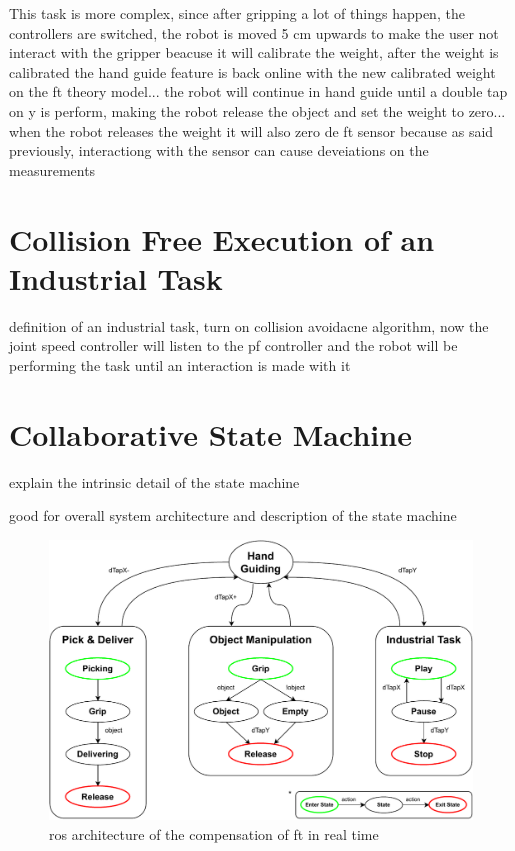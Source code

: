 \par This task is more complex, since after gripping a lot of things happen, the controllers are switched, the robot is moved 5 cm upwards to make the user not interact with the gripper beacuse it will calibrate the weight, after the weight is calibrated the hand guide feature is back online with the new calibrated weight on the ft theory model... the robot will continue in hand guide until a double tap on y is perform, making the robot release the object and set the weight to zero... when the robot releases the weight it will also zero de ft sensor because as said previously, interactiong with the sensor can cause deveiations on the measurements

\section{Collision Free Execution of an Industrial Task}

\par definition of an industrial task, turn on collision avoidacne algorithm, now the joint speed controller will listen to the pf controller and the robot will be performing the task until an interaction is made with it

\section{Collaborative State Machine}

\par explain the intrinsic detail of the state machine
\par good for overall system architecture and description of the state machine

\begin{figure}[h]
    \centering
    \includegraphics[width=0.8\linewidth]{figs/chp5/ros_ur10e_smach.pdf}
    \caption{\ac{ros} architecture of the compensation of \ac{ft} in real time}
    \label{fig:ros_smach}
\end{figure}

